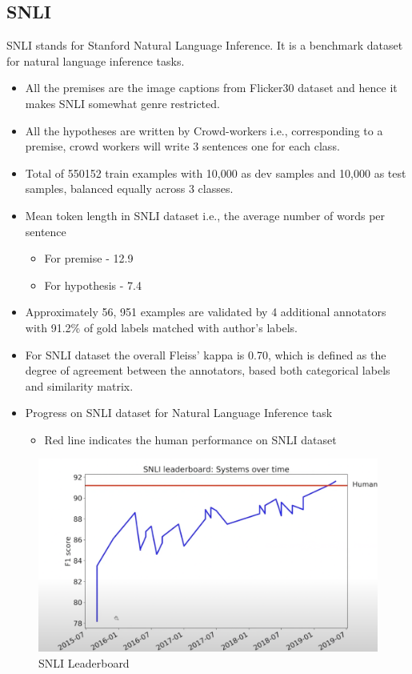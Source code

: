 \subsection{SNLI}
SNLI stands for Stanford Natural Language Inference. It is a benchmark dataset for natural language inference tasks.
\begin{itemize}
	\item All the premises are the image captions from Flicker30 dataset and hence it makes SNLI somewhat genre restricted.
	\item All the hypotheses are written by Crowd-workers i.e., corresponding to a premise, crowd workers will write 3 sentences one for each class.
	\item Total of 550152 train examples with 10,000 as dev samples and 10,000 as test samples, balanced equally across 3 classes.
	\item Mean token length in SNLI dataset i.e., the average number of words per sentence
	\begin{itemize}
		\item For premise - 12.9 
		\item For hypothesis - 7.4
	\end{itemize}
	\item Approximately 56, 951 examples are validated by 4 additional annotators with 91.2\% of gold labels matched with author’s labels.
	\item For SNLI dataset the overall Fleiss' kappa is 0.70, which is defined as the degree of agreement between the annotators, based both categorical labels and similarity matrix.
	\item Progress on SNLI dataset for Natural Language Inference task
	\begin{itemize}
		\item Red line indicates the human performance on SNLI dataset
	\end{itemize}
	\end{itemize}
	
	\begin{figure}[h]
		\centering
		\includegraphics[scale=0.5]{img/snli.png}
		\caption{SNLI Leaderboard \cite{ytvid}}
	\end{figure}
	

